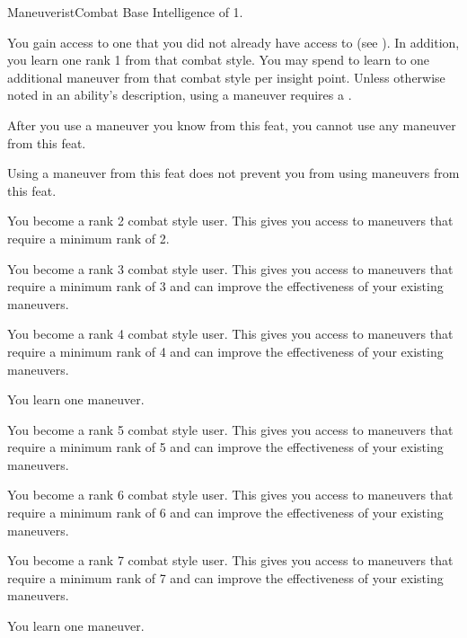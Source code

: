     \begin{feat}{Maneuverist}{Combat}
        \featpre Base Intelligence of 1.

         You gain access to one  that you did not already have access to (see ).
        In addition, you learn one rank 1  from that combat style.
        You may spend  to learn to one additional maneuver from that combat style per insight point.
        Unless otherwise noted in an ability's description, using a maneuver requires a .

        After you use a maneuver you know from this feat, you  cannot use any maneuver from this feat.

         Using a maneuver from this feat does not prevent you from using maneuvers from this feat.

         You become a rank 2 combat style user.
        This gives you access to maneuvers that require a minimum rank of 2.

         You become a rank 3 combat style user.
        This gives you access to maneuvers that require a minimum rank of 3 and can improve the effectiveness of your existing maneuvers.

         You become a rank 4 combat style user.
        This gives you access to maneuvers that require a minimum rank of 4 and can improve the effectiveness of your existing maneuvers.

         You learn one maneuver.

         You become a rank 5 combat style user.
        This gives you access to maneuvers that require a minimum rank of 5 and can improve the effectiveness of your existing maneuvers.

         You become a rank 6 combat style user.
        This gives you access to maneuvers that require a minimum rank of 6 and can improve the effectiveness of your existing maneuvers.

         You become a rank 7 combat style user.
        This gives you access to maneuvers that require a minimum rank of 7 and can improve the effectiveness of your existing maneuvers.

         You learn one maneuver.
    \end{feat}

